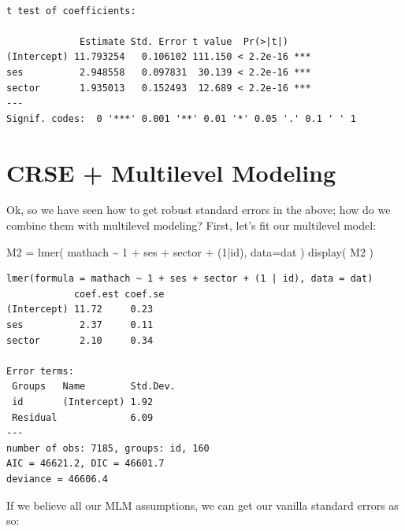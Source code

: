 \documentclass[
  letterpaper,
  DIV=11,
  numbers=noendperiod]{scrreprt}
\newenvironment{Shaded}{}{}
\newcommand{\AttributeTok}[1]{\textcolor[rgb]{0.49,0.56,0.16}{#1}}
\newcommand{\DecValTok}[1]{\textcolor[rgb]{0.25,0.63,0.44}{#1}}
\newcommand{\FunctionTok}[1]{\textcolor[rgb]{0.02,0.16,0.49}{#1}}
\newcommand{\NormalTok}[1]{#1}
\newcommand{\OtherTok}[1]{\textcolor[rgb]{0.00,0.44,0.13}{#1}}
\newcommand{\SpecialCharTok}[1]{\textcolor[rgb]{0.25,0.44,0.63}{#1}}
\begin{document}
\begin{verbatim}

t test of coefficients:

             Estimate Std. Error t value  Pr(>|t|)    
(Intercept) 11.793254   0.106102 111.150 < 2.2e-16 ***
ses          2.948558   0.097831  30.139 < 2.2e-16 ***
sector       1.935013   0.152493  12.689 < 2.2e-16 ***
---
Signif. codes:  0 '***' 0.001 '**' 0.01 '*' 0.05 '.' 0.1 ' ' 1
\end{verbatim}

\section{CRSE + Multilevel Modeling}\label{crse-multilevel-modeling}

Ok, so we have seen how to get robust standard errors in the above; how
do we combine them with multilevel modeling? First, let's fit our
multilevel model:

\begin{Shaded}
\begin{Highlighting}[]
\NormalTok{M2 }\OtherTok{=} \FunctionTok{lmer}\NormalTok{( mathach }\SpecialCharTok{\textasciitilde{}} \DecValTok{1} \SpecialCharTok{+}\NormalTok{ ses }\SpecialCharTok{+}\NormalTok{ sector }\SpecialCharTok{+}\NormalTok{ (}\DecValTok{1}\SpecialCharTok{|}\NormalTok{id), }\AttributeTok{data=}\NormalTok{dat )}
\FunctionTok{display}\NormalTok{( M2 )}
\end{Highlighting}
\end{Shaded}

\begin{verbatim}
lmer(formula = mathach ~ 1 + ses + sector + (1 | id), data = dat)
            coef.est coef.se
(Intercept) 11.72     0.23  
ses          2.37     0.11  
sector       2.10     0.34  

Error terms:
 Groups   Name        Std.Dev.
 id       (Intercept) 1.92    
 Residual             6.09    
---
number of obs: 7185, groups: id, 160
AIC = 46621.2, DIC = 46601.7
deviance = 46606.4 
\end{verbatim}

If we believe all our MLM assumptions, we can get our vanilla standard
errors as so:

\begin{Shaded}
\end{Shaded}
\end{document}
